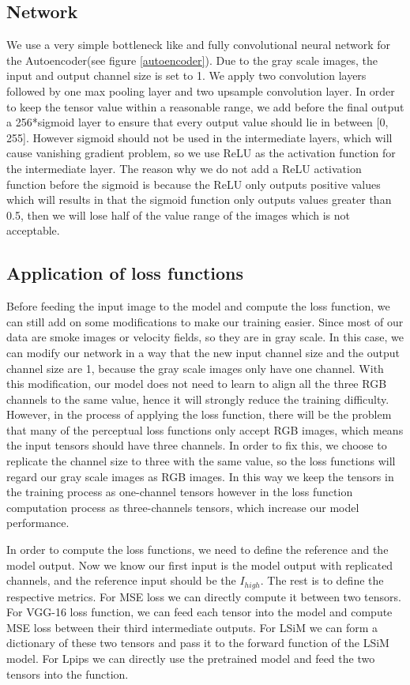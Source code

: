 \documentclass[a4paper,12pt,twoside]{report}
\begin{document}
\subsection{Network}
We use a very simple bottleneck like and fully convolutional neural network for the Autoencoder(see figure \ref{autoencoder}). Due to the gray scale images, the input and output channel size is set to 1. We apply two convolution layers followed by one max pooling layer and two upsample convolution layer. In order to keep the tensor value within a reasonable range, we add before the final output a 256*sigmoid layer to ensure that every output value should lie in between [0, 255]. However sigmoid should not be used in the intermediate layers, which will cause vanishing gradient problem, so we use ReLU as the activation function for the intermediate layer. The reason why we do not add a ReLU activation function before the sigmoid is because the ReLU only outputs positive values which will results in that the sigmoid function only outputs values greater than 0.5, then we will lose half of the value range of the images which is not acceptable.
\subsection{Application of loss functions}
Before feeding the input image to the model and compute the loss function, we can still add on some modifications to make our training easier. Since most of our data are smoke images or velocity fields, so they are in gray scale. In this case, we can modify our network in a way that the new input channel size and the output channel size are 1, because the gray scale images only have one channel. With this modification, our model does not need to learn to align all the three RGB channels to the same value, hence it will strongly reduce the training difficulty. However, in the process of applying the loss function, there will be the problem that many of the perceptual loss functions only accept RGB images, which means the input tensors should have three channels. In order to fix this, we choose to replicate the channel size to three with the same value, so the loss functions will regard our gray scale images as RGB images. In this way we keep the tensors in the training process as one-channel tensors however in the loss function computation process as three-channels tensors, which increase our model performance.

In order to compute the loss functions, we need to define the reference and the model output. Now we know our first input is the model output with replicated channels, and the reference input should be the $I_{high}$. The rest is to define the respective metrics. For MSE loss we can directly compute it between two tensors. For VGG-16 loss function, we can feed each tensor into the model and compute MSE loss between their third intermediate outputs. For LSiM we can form a dictionary of these two tensors and pass it to the forward function of the LSiM model. For Lpips we can directly use the pretrained model and feed the two tensors into the function.
\end{document}
